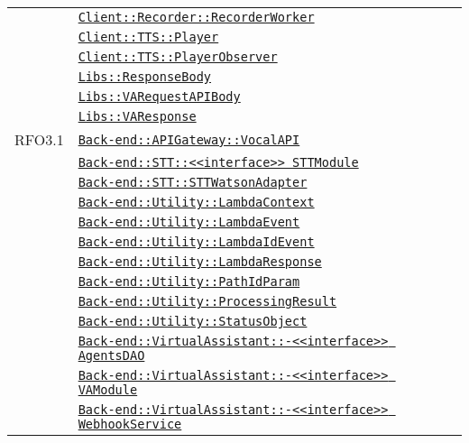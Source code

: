\begin{longtable}{|>{\centering}m{3cm}|m{10cm}<{\centering}|}
& \hyperref[Client::Recorder::RecorderWorker]{\texttt{Client::Recorder::RecorderWorker}}\\
& \hyperref[Client::TTS::Player]{\texttt{Client::TTS::Player}}\\
& \hyperref[Client::TTS::PlayerObserver]{\texttt{Client::TTS::PlayerObserver}}\\
& \hyperref[Libs::ResponseBody]{\texttt{Libs::ResponseBody}}\\
& \hyperref[Libs::VARequestAPIBody]{\texttt{Libs::VARequestAPIBody}}\\
& \hyperref[Libs::VAResponse]{\texttt{Libs::VAResponse}}\\ \hline

RFO3.1 & \hyperref[Back-end::APIGateway::VocalAPI]{\texttt{Back-end::APIGateway::VocalAPI}}\\
& \hyperref[Back-end::STT::<<interface>> STTModule]{\texttt{Back-end::STT::<<interface>> STTModule}}\\
& \hyperref[Back-end::STT::STTWatsonAdapter]{\texttt{Back-end::STT::STTWatsonAdapter}}\\
& \hyperref[Back-end::Utility::LambdaContext]{\texttt{Back-end::Utility::LambdaContext}}\\
& \hyperref[Back-end::Utility::LambdaEvent]{\texttt{Back-end::Utility::LambdaEvent}}\\
& \hyperref[Back-end::Utility::LambdaIdEvent]{\texttt{Back-end::Utility::LambdaIdEvent}}\\
& \hyperref[Back-end::Utility::LambdaResponse]{\texttt{Back-end::Utility::LambdaResponse}}\\
& \hyperref[Back-end::Utility::PathIdParam]{\texttt{Back-end::Utility::PathIdParam}}\\
& \hyperref[Back-end::Utility::ProcessingResult]{\texttt{Back-end::Utility::ProcessingResult}}\\
& \hyperref[Back-end::Utility::StatusObject]{\texttt{Back-end::Utility::StatusObject}}\\
& \hyperref[Back-end::VirtualAssistant::<<interface>> AgentsDAO]{\texttt{Back-end::VirtualAssistant::-\linebreak <<interface>> AgentsDAO}}\\
& \hyperref[Back-end::VirtualAssistant::<<interface>> VAModule]{\texttt{Back-end::VirtualAssistant::-\linebreak <<interface>> VAModule}}\\
& \hyperref[Back-end::VirtualAssistant::<<interface>> WebhookService]{\texttt{Back-end::VirtualAssistant::-\linebreak <<interface>> WebhookService}}\\

\end{longtable}
